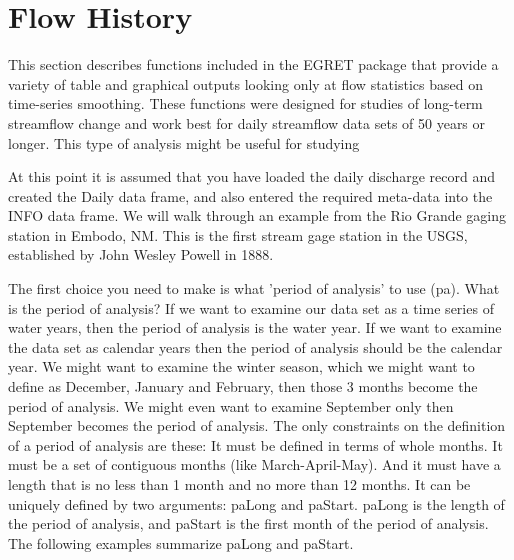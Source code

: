 \documentclass[a4paper,11pt]{article}
\begin{document}
\section{Flow History}
\label{sec:flowHistory}
This section describes functions included in the EGRET package that provide a variety of table and graphical outputs looking only at flow statistics based on time-series smoothing. These functions were designed for studies of long-term streamflow change and work best for daily streamflow data sets of 50 years or longer. This type of analysis might be useful for studying 

At this point it is assumed that you have loaded the daily discharge record and created the Daily data frame, and also entered the required meta-data into the INFO data frame. We will walk through an example from the Rio Grande gaging station in Embodo, NM.  This is the first stream gage station in the USGS, established by John Wesley Powell in 1888.


\begin{Schunk}
\end{Schunk}

The first choice you need to make is what 'period of analysis' to use (pa). What is the period of analysis?  If we want to examine our data set as a time series of water years, then the period of analysis is the water year.  If we want to examine the data set as calendar years then the period of analysis should be the calendar year.  We might want to examine the winter season, which we might want to define as December, January and February, then those 3 months become the period of analysis.  We might even want to examine September only then September becomes the period of analysis.  The only constraints on the definition of a period of analysis are these: It must be defined in terms of whole months.  It must be a set of contiguous months (like March-April-May).  And it must have a length that is no less than 1 month and no more than 12 months.  It can be uniquely defined by two arguments: paLong and paStart.  paLong is the length of the period of analysis, and paStart is the first month of the period of analysis. The following examples summarize paLong and paStart.
\end{document}
